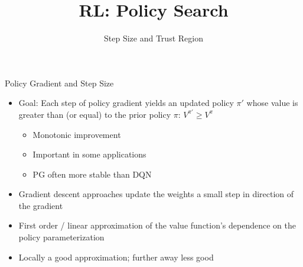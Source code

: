 \documentclass[aspectratio=169]{../latex_main/tntbeamer}  %
\title[RL: Policy Gradient]{RL: Policy Search}
\subtitle{Step Size and Trust Region}
\begin{document}
	
	\maketitle

\begin{frame}[c]{Policy Gradient and Step Size}
	
    \begin{itemize}
        \item Goal: Each step of policy gradient yields an updated policy $\pi'$ whose value is greater than (or equal) to the prior policy $\pi$: $V^{\pi'} \geq V^\pi$
        \begin{itemize}
            \item Monotonic improvement
            \item Important in some applications
            \item PG often more stable than DQN
        \end{itemize} 
        \item Gradient descent approaches update the weights a small step in direction of the gradient
        \item First order / linear approximation of the value function's dependence on the policy parameterization
        \item Locally a good approximation; further away less good
    \end{itemize}

\end{frame}
\end{document}
